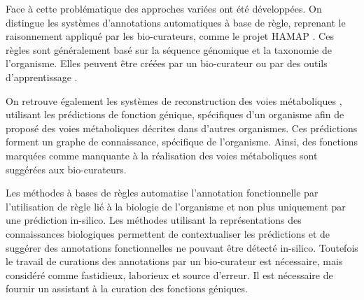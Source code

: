 Face à cette problématique des approches variées ont été développées. On distingue les systèmes d'annotations automatiques à base de règle, reprenant le raisonnement appliqué par les bio-curateurs, comme le projet HAMAP \citep[voir][]{lima2009hamap}. Ces règles sont généralement basé sur la séquence génomique et la taxonomie de l'organisme. Elles peuvent être créées par un bio-curateur ou par des outils d'apprentissage \citep[voir][]{uniprot2011ongoing}.

On retrouve également les systèmes de reconstruction des voies métaboliques \citep[voir][]{karpe2011pathway}, utilisant les prédictions de fonction génique, spécifiques d'un organisme afin de proposé des voies métaboliques décrites dans d'autres organismes. Ces prédictions forment un graphe de connaissance, spécifique de l'organisme. Ainsi, des fonctions marquées comme manquante à la réalisation des voies métaboliques sont suggérées aux bio-curateurs.

Les méthodes à bases de règles automatise l'annotation fonctionnelle par l'utilisation de règle lié à la biologie de l'organisme et non plus uniquement par une prédiction in-silico. Les méthodes utilisant la représentations des connaissances biologiques permettent de contextualiser les prédictions et de suggérer des annotations fonctionnelles ne pouvant être détecté in-silico. Toutefois le travail de curations des annotations par un bio-curateur est nécessaire, mais considéré comme fastidieux, laborieux et source d'erreur. Il est nécessaire de fournir un assistant à la curation des fonctions géniques.




